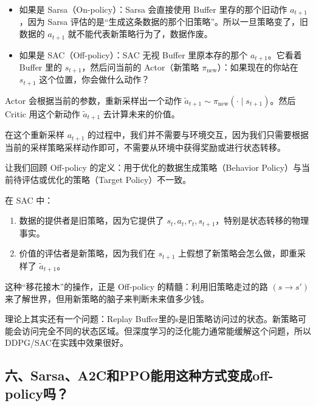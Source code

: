 \begin{itemize}
\tightlist
\item
  如果是 Sarsa（On-policy）：Sarsa 会直接使用 Buffer 里存的那个旧动作 \(a_{t+1}\)，因为 Sarsa 评估的是``生成这条数据的那个旧策略''。所以一旦策略变了，旧数据的 \(a_{t+1}\) 就不能代表新策略行为了，数据作废。
\item
  如果是 SAC（Off-policy）：SAC 无视 Buffer 里原本存的那个 \(a_{t+1}\)。它看着 Buffer 里的 \(s_{t+1}\)，然后问当前的 Actor（新策略 \(\pi_{\mathrm{new}}\)）：如果现在的你站在 \(s_{t+1}\) 这个位置，你会做什么动作？
\end{itemize}

Actor 会根据当前的参数，重新采样出一个动作 \(\tilde{a}_{t+1}\sim\pi_{\mathrm{new}}(\cdot\mid s_{t+1})\)。然后 Critic 用这个新动作 \(\tilde{a}_{t+1}\) 去计算未来的价值。

在这个重新采样 \(a_{t+1}\) 的过程中，我们并不需要与环境交互，因为我们只需要根据当前的采样策略采样动作即可，不需要从环境中获得奖励或进行状态转移。

让我们回顾 Off-policy 的定义：用于优化的数据生成策略（Behavior Policy）与当前待评估或优化的策略（Target Policy）不一致。

在 SAC 中：

\begin{enumerate}
\def\labelenumi{\arabic{enumi}.}
\tightlist
\item
  数据的提供者是旧策略，因为它提供了 \(s_t,a_t,r_t,s_{t+1}\)，特别是状态转移的物理事实。
\item
  价值的评估者是新策略，因为我们在 \(s_{t+1}\) 上假想了新策略会怎么做，即重采样了 \(\tilde{a}_{t+1}\)。
\end{enumerate}

这种``移花接木''的操作，正是 Off-policy 的精髓：利用旧策略走过的路 \((s\to s')\) 来了解世界，但用新策略的脑子来判断未来值多少钱。

理论上其实还有一个问题：Replay Buffer里的s是旧策略访问过的状态。新策略可能会访问完全不同的状态区域。但深度学习的泛化能力通常能缓解这个问题，所以DDPG/SAC在实践中效果很好。

\hypertarget{ux516dsarsaa2cux548cppoux80fdux7528ux8fd9ux79cdux65b9ux5f0fux53d8ux6210off-policyux5417}{%
\subsection{六、Sarsa、A2C和PPO能用这种方式变成off-policy吗？}\label{ux516dsarsaa2cux548cppoux80fdux7528ux8fd9ux79cdux65b9ux5f0fux53d8ux6210off-policyux5417}}


